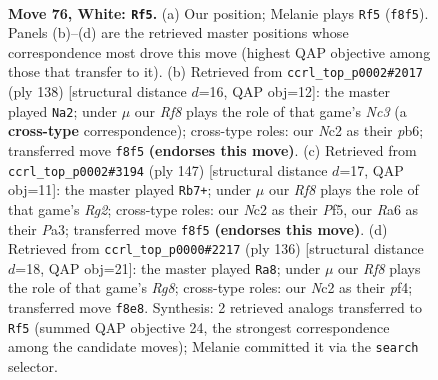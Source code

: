 \documentclass[11pt]{article}
\begin{document}
\clearpage

\begin{figure}[p]\centering
\begin{subfigure}{0.46\textwidth}\centering
\resizebox{\linewidth}{!}{%
\newchessgame
\chessboard[
  setfen={5R2/1r4bk/R7/8/2P5/8/2N3K1/8 w - - 72 76},
  showmover=false,
  pgfstyle=straightmove, color=movearrow, markmove={f8-f5}
]}
\caption{}
\end{subfigure}\hfill
\begin{subfigure}{0.46\textwidth}\centering
\resizebox{\linewidth}{!}{%
\newchessgame
\chessboard[
  setfen={1k6/5R2/1p2K3/8/1b5r/2N5/8/8 w - - 6 70},
  showmover=false,
  pgfstyle=straightmove, color=movearrow, markmove={c3-a2}
]}
\caption{}
\end{subfigure}
\\[4pt]
\begin{subfigure}{0.46\textwidth}\centering
\resizebox{\linewidth}{!}{%
\newchessgame
\chessboard[
  setfen={8/6r1/4R3/4Bp2/1K6/p2k4/P7/8 b - - 13 74},
  showmover=false,
  pgfstyle=straightmove, color=movearrow, markmove={g7-b7}
]}
\caption{}
\end{subfigure}\hfill
\begin{subfigure}{0.46\textwidth}\centering
\resizebox{\linewidth}{!}{%
\newchessgame
\chessboard[
  setfen={6R1/2rk3b/1R6/8/3K1p2/8/8/8 w - - 2 69},
  showmover=false,
  pgfstyle=straightmove, color=movearrow, markmove={g8-a8}
]}
\caption{}
\end{subfigure}
\caption{\textbf{Move 76, White: \texttt{Rf5}.} (a) Our position; Melanie plays \texttt{Rf5} (\texttt{f8f5}). Panels (b)--(d) are the retrieved master positions whose correspondence most drove this move (highest QAP objective among those that transfer to it). (b) Retrieved from \texttt{ccrl\_top\_p0002\#2017} (ply 138) [structural distance $d$=16, QAP obj=12]: the master played \texttt{Na2}; under $\mu$ our \emph{Rf8} plays the role of that game's \emph{Nc3} (a \textbf{cross-type} correspondence); cross-type roles: our \emph{N}c2 as their \emph{p}b6; transferred move \texttt{f8f5} \textbf{(endorses this move)}. (c) Retrieved from \texttt{ccrl\_top\_p0002\#3194} (ply 147) [structural distance $d$=17, QAP obj=11]: the master played \texttt{Rb7+}; under $\mu$ our \emph{Rf8} plays the role of that game's \emph{Rg2}; cross-type roles: our \emph{N}c2 as their \emph{P}f5, our \emph{R}a6 as their \emph{P}a3; transferred move \texttt{f8f5} \textbf{(endorses this move)}. (d) Retrieved from \texttt{ccrl\_top\_p0000\#2217} (ply 136) [structural distance $d$=18, QAP obj=21]: the master played \texttt{Ra8}; under $\mu$ our \emph{Rf8} plays the role of that game's \emph{Rg8}; cross-type roles: our \emph{N}c2 as their \emph{p}f4; transferred move \texttt{f8e8}. Synthesis: 2 retrieved analogs transferred to \texttt{Rf5} (summed QAP objective 24, the strongest correspondence among the candidate moves); Melanie committed it via the \texttt{search} selector.}
\label{fig:thought-m150}
\end{figure}
\end{document}
